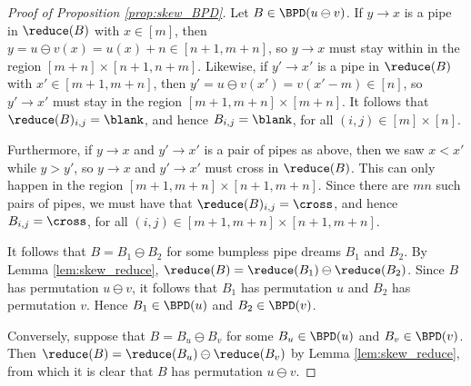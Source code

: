 \begin{proof}[Proof of Proposition \ref{prop:skew_BPD}]
Let $B\in \BPD(u\ominus v)$.
If $y\to x$ is a pipe in $\reduce(B)$ with $x\in [m]$, then $y = u\ominus v(x) = u(x)+n \in [n+1,m+n]$, so $y\to x$ must stay within in the region $[m+n]\times[n+1,n+m]$.
Likewise, if $y'\to x'$ is a pipe in $\reduce(B)$ with $x'\in [m+1,m+n]$, then $y' = u\ominus v(x') = v(x'-m) \in [n]$, so $y'\to x'$ must stay in the region $[m+1,m+n]\times [m+n]$.
It follows that $\reduce(B)_{i,j} = \blank$, and hence $B_{i,j} = \blank$, for all $(i,j)\in [m]\times [n]$.

Furthermore, if $y\to x$ and $y'\to x'$ is a pair of pipes as above, then we saw $x < x'$ while $y > y'$, so $y\to x$ and $y'\to x'$ must cross in $\reduce(B)$.
This can only happen in the region $[m+1,m+n]\times [n+1,m+n]$.
Since there are $mn$ such pairs of pipes, we must have that $\reduce(B)_{i,j} = \cross$, and hence $B_{i,j} = \cross$, for all $(i,j)\in [m+1,m+n]\times [n+1,m+n]$.

It follows that $B = B_1\ominus B_2$ for some bumpless pipe dreams $B_1$ and $B_2$.
By Lemma \ref{lem:skew_reduce}, $\reduce(B) = \reduce(B_1)\ominus \reduce(B_2)$.
Since $B$ has permutation $u\ominus v$, it follows that $B_1$ has permutation $u$ and $B_2$ has permutation $v$.
Hence $B_1\in \BPD(u)$ and $B_2\in \BPD(v)$.

Conversely, suppose that $B = B_u\ominus B_v$ for some $B_u\in \BPD(u)$ and $B_v\in \BPD(v)$.
Then $\reduce(B) = \reduce(B_u)\ominus \reduce(B_v)$ by Lemma \ref{lem:skew_reduce}, from which it is clear that $B$ has permutation $u\ominus v$.
\end{proof}



